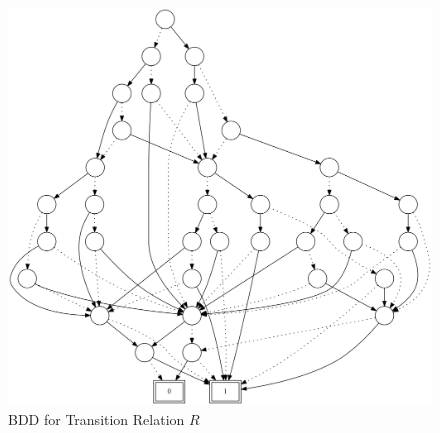\documentclass[a4paper,11pt]{article}
\theoremstyle{mytheor}
\begin{document}
\begin{figure}
\centering
\includegraphics[width=\textwidth]{HW4_bdd}
\caption{BDD for Transition Relation $R$}
\label{fig:BDD_R}
\end{figure}
\end{document}
